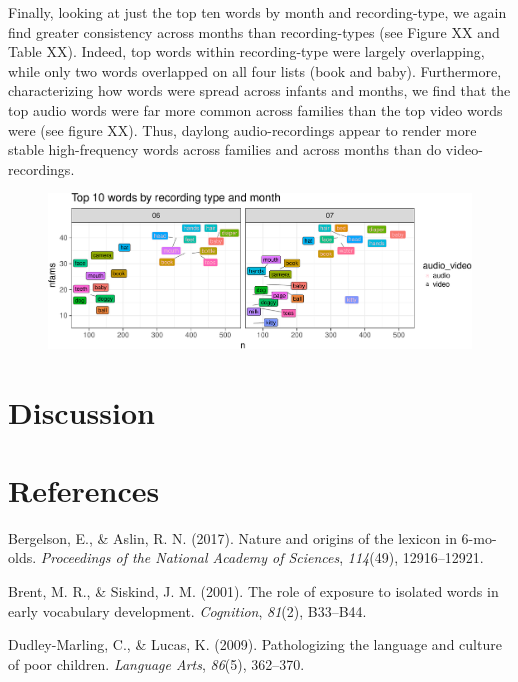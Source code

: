 \documentclass[man]{apa6}
\theoremstyle{definition}
\theoremstyle{definition}
\theoremstyle{definition}
\theoremstyle{remark}
\begin{document}
Finally, looking at just the top ten words by month and recording-type,
we again find greater consistency across months than recording-types
(see Figure XX and Table XX). Indeed, top words within recording-type
were largely overlapping, while only two words overlapped on all four
lists (book and baby). Furthermore, characterizing how words were spread
across infants and months, we find that the top audio words were far
more common across families than the top video words were (see figure
XX). Thus, daylong audio-recordings appear to render more stable
high-frequency words across families and across months than do
video-recordings.

\begin{figure}[htbp]
\centering
\includegraphics{sixseven_papaja_files/figure-latex/top10noun_freq-1.pdf}
\caption{}
\end{figure}

\section{Discussion}\label{discussion}

\newpage

\section{References}\label{references}

\setlength{\parindent}{-0.5in} \setlength{\leftskip}{0.5in}

\hypertarget{refs}{}
\hypertarget{ref-bergelson2017nature}{}
Bergelson, E., \& Aslin, R. N. (2017). Nature and origins of the lexicon
in 6-mo-olds. \emph{Proceedings of the National Academy of Sciences},
\emph{114}(49), 12916--12921.

\hypertarget{ref-brent2001role}{}
Brent, M. R., \& Siskind, J. M. (2001). The role of exposure to isolated
words in early vocabulary development. \emph{Cognition}, \emph{81}(2),
B33--B44.

\hypertarget{ref-dudley2009pathologizing}{}
Dudley-Marling, C., \& Lucas, K. (2009). Pathologizing the language and
culture of poor children. \emph{Language Arts}, \emph{86}(5), 362--370.
\end{document}
